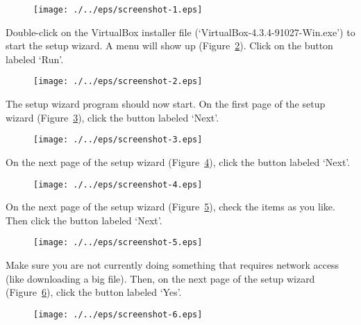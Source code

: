 \begin{figure}[ht]
  \centering
    \texttt{[image: ./../eps/screenshot-1.eps]}
  \caption{}
  \label{fig:screenshot-1}
\end{figure}


Double-click on the VirtualBox installer file (`VirtualBox-4.3.4-91027-Win.exe') to start the setup wizard. A menu will show up (Figure~\ref{fig:screenshot-2}). Click on the button labeled `Run'.

\begin{figure}[ht]
  \centering
    \texttt{[image: ./../eps/screenshot-2.eps]}
  \caption{}
  \label{fig:screenshot-2}
\end{figure}
\clearpage


The setup wizard program should now start. On the first page of the setup wizard (Figure~\ref{fig:screenshot-3}), click the button labeled `Next'.

\begin{figure}[ht]
  \centering
    \texttt{[image: ./../eps/screenshot-3.eps]}
  \caption{}
  \label{fig:screenshot-3}
\end{figure}


On the next page of the setup wizard (Figure~\ref{fig:screenshot-4}), click the button labeled `Next'.

\begin{figure}[ht]
  \centering
    \texttt{[image: ./../eps/screenshot-4.eps]}
  \caption{}
  \label{fig:screenshot-4}
\end{figure}
\clearpage

On the next page of the setup wizard (Figure~\ref{fig:screenshot-5}), check the items as you like. Then click the button labeled `Next'.

\begin{figure}[ht]
  \centering
    \texttt{[image: ./../eps/screenshot-5.eps]}
  \caption{}
  \label{fig:screenshot-5}
\end{figure}


Make sure you are not currently doing something that requires network access (like downloading a big file). Then, on the next page of the setup wizard (Figure~\ref{fig:screenshot-6}), click the button labeled `Yes'.

\begin{figure}[ht]
  \centering
    \texttt{[image: ./../eps/screenshot-6.eps]}
  \caption{}
  \label{fig:screenshot-6}
\end{figure}
\clearpage

